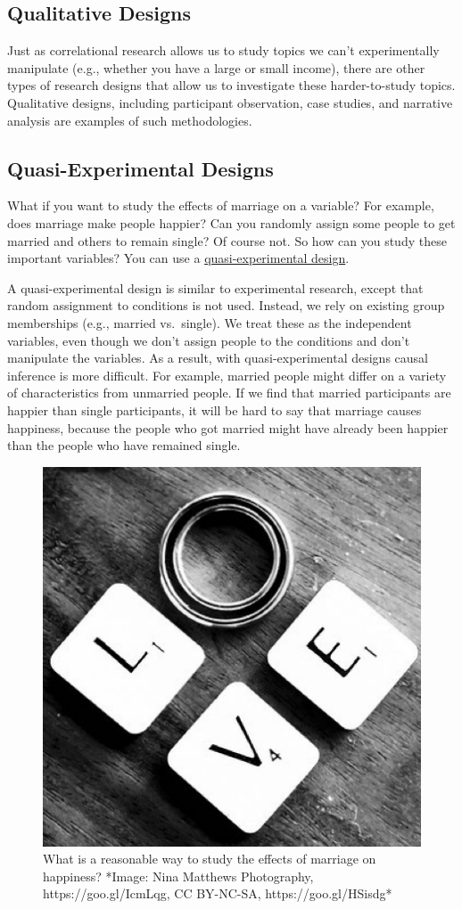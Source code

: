 \documentclass[
]{krantz}
\begin{document}
\hypertarget{qualitative-designs}{%
\subsection*{Qualitative Designs}\label{qualitative-designs}}


Just as correlational research allows us to study topics we can't experimentally manipulate (e.g., whether you have a large or small income), there are other types of research designs that allow us to investigate these harder-to-study topics. Qualitative designs, including participant observation, case studies, and narrative analysis are examples of such methodologies.

\hypertarget{quasi-experimental-designs}{%
\subsection*{Quasi-Experimental Designs}\label{quasi-experimental-designs}}


What if you want to study the effects of marriage on a variable? For example, does marriage make people happier? Can you randomly assign some people to get married and others to remain single? Of course not. So how can you study these important variables? You can use a \protect\hyperlink{quasi-experimental-design}{quasi-experimental design}.

A quasi-experimental design is similar to experimental research, except that random assignment to conditions is not used. Instead, we rely on existing group memberships (e.g., married vs.~single). We treat these as the independent variables, even though we don't assign people to the conditions and don't manipulate the variables. As a result, with quasi-experimental designs causal inference is more difficult. For example, married people might differ on a variety of characteristics from unmarried people. If we find that married participants are happier than single participants, it will be hard to say that marriage causes happiness, because the people who got married might have already been happier than the people who have remained single.

\begin{figure}

{\centering \includegraphics[width=0.4\linewidth]{images/ch1/love} 

}

\caption{What is a reasonable way to study the effects of marriage on happiness? *Image: Nina Matthews Photography, https://goo.gl/IcmLqg, CC BY-NC-SA, https://goo.gl/HSisdg*}\label{fig:love}
\end{figure}
\end{document}
